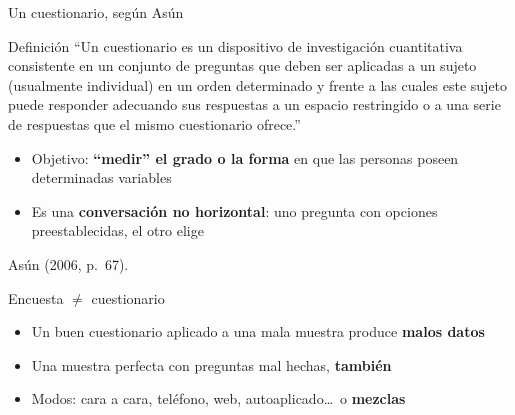 \documentclass[aspectratio=169,11pt]{beamer}
\newcommand{\hl}[1]{\textcolor{marino}{\textbf{#1}}}        %
\newcommand{\fuente}[1]{\par\vfill{\scriptsize\color{gris}#1\par}}
\begin{document}
\begin{frame}{Un cuestionario, según Asún}
\begin{block}{Definición}
\small
``Un cuestionario es un dispositivo de investigación cuantitativa consistente en un conjunto de preguntas que deben ser aplicadas a un sujeto (usualmente individual) en un orden determinado y frente a las cuales este sujeto puede responder adecuando sus respuestas a un espacio restringido o a una serie de respuestas que el mismo cuestionario ofrece.''
\end{block}
\bigskip
\begin{itemize}
  \item Objetivo: \hl{``medir'' el grado o la forma} en que las personas poseen determinadas variables
  \item Es una \textbf{conversación no horizontal}: uno pregunta con opciones preestablecidas, el otro elige
\end{itemize}
\fuente{Asún (2006, p.~67).}
\end{frame}

\begin{frame}{Encuesta $\neq$ cuestionario}
\centering
{}
\bigskip
\begin{itemize}
  \item Un buen cuestionario aplicado a una mala muestra produce \textbf{malos datos}
  \item Una muestra perfecta con preguntas mal hechas, \textbf{también}
  \item Modos: cara a cara, teléfono, web, autoaplicado\ldots\ o \hl{mezclas}
\end{itemize}
\end{frame}
\end{document}

